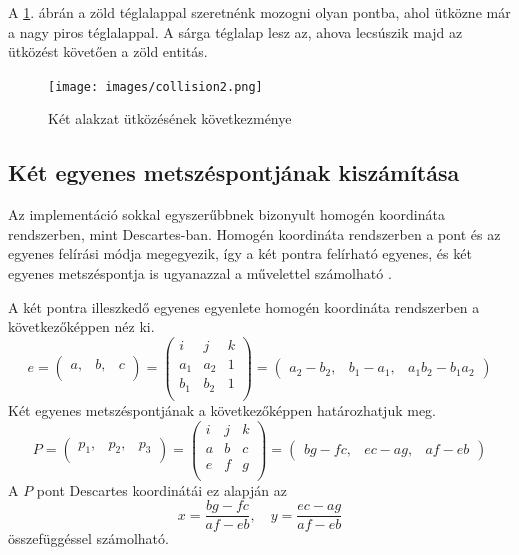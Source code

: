 A \ref{fig:collision2}. ábrán a zöld téglalappal szeretnénk mozogni olyan pontba, ahol ütközne már a nagy piros téglalappal. A sárga téglalap lesz az, ahova lecsúszik majd az ütközést követ\H oen a zöld entitás.

\begin{figure}[htb]
	\begin{center}
		\texttt{[image: images/collision2.png]}
		\caption{Két alakzat ütközésének következménye}
		\label{fig:collision2}
	\end{center}
\end{figure}

\subsection{Két egyenes metszéspontjának kiszámítása}

Az implementáció sokkal egyszerűbbnek bizonyult homogén koordináta rendszerben, mint Descartes-ban. Homogén koordináta rendszerben a pont és az egyenes felírási módja megegyezik, így a két pontra felírható egyenes, és két egyenes metszéspontja is ugyanazzal a művelettel számolható \cite{Homo}.

A két pontra illeszkedő egyenes egyenlete homogén koordináta rendszerben a következőképpen néz ki.
$$
e = (
\begin{matrix}
a, & b, & c \\
\end{matrix}
) =
\left(
\begin{matrix}
i & j & k \\
a_1 & a_2 & 1 \\
b_1 & b_2 & 1 \\
\end{matrix}
\right) =
(
\begin{matrix}
a_2 - b_2, & b_1 - a_1, & a_1 b_2 - b_1 a_2
\end{matrix}
)
$$
Két egyenes metszéspontjának a következőképpen határozhatjuk meg.
$$
P = (
\begin{matrix}
p_1, & p_2, & p_3 \\
\end{matrix}
) =
\left(
\begin{matrix}
i & j & k \\
a & b & c \\
e & f & g \\
\end{matrix}
\right) =
(
\begin{matrix}
bg - fc, & ec - ag, & af - eb
\end{matrix}
)
$$
A $P$ pont Descartes koordinátái ez alapján az
$$
x = \dfrac{bg - fc}{af - eb}, \quad
y = \dfrac{ec - ag}{af - eb}
$$
összefüggéssel számolható.

